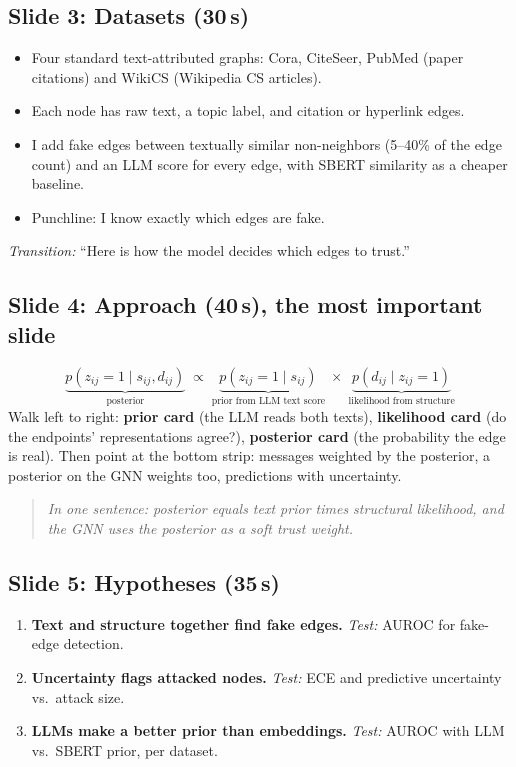 \documentclass[11pt]{article}
\newcommand{\say}[1]{\begin{quote}\itshape #1\end{quote}}
\begin{document}
\subsection*{Slide 3: Datasets (30\,s)}
\begin{itemize}
  \item Four standard text-attributed graphs: Cora, CiteSeer, PubMed (paper citations) and
        WikiCS (Wikipedia CS articles).
  \item Each node has raw text, a topic label, and citation or hyperlink edges.
  \item I add fake edges between textually similar non-neighbors (5--40\% of the edge count)
        and an LLM score for every edge, with SBERT similarity as a cheaper baseline.
  \item Punchline: I know exactly which edges are fake.
\end{itemize}
\emph{Transition:} ``Here is how the model decides which edges to trust.''

\subsection*{Slide 4: Approach (40\,s), the most important slide}
\[
\underbrace{p(z_{ij}=1 \mid s_{ij}, d_{ij})}_{\text{posterior}}
\;\propto\;
\underbrace{p(z_{ij}=1 \mid s_{ij})}_{\text{prior from LLM text score}}
\;\times\;
\underbrace{p(d_{ij} \mid z_{ij}=1)}_{\text{likelihood from structure}}
\]
Walk left to right: \textbf{prior card} (the LLM reads both texts), \textbf{likelihood card}
(do the endpoints' representations agree?), \textbf{posterior card} (the probability the edge
is real). Then point at the bottom strip: messages weighted by the posterior, a posterior on
the GNN weights too, predictions with uncertainty.
\say{In one sentence: posterior equals text prior times structural likelihood, and the GNN
uses the posterior as a soft trust weight.}

\subsection*{Slide 5: Hypotheses (35\,s)}
\begin{enumerate}[label=\textbf{H\arabic*}]
  \item \textbf{Text and structure together find fake edges.} \emph{Test:} AUROC for
        fake-edge detection.
  \item \textbf{Uncertainty flags attacked nodes.} \emph{Test:} ECE and predictive
        uncertainty vs.\ attack size.
  \item \textbf{LLMs make a better prior than embeddings.} \emph{Test:} AUROC with LLM vs.\
        SBERT prior, per dataset.
\end{enumerate}
\end{document}

